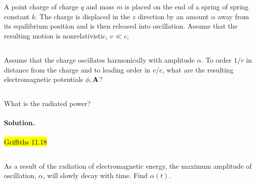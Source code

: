 \documentclass[11pt]{article}
\newenvironment{statement}[1]
{
	\section{#1}
	\color{darkgray}
	\ignorespaces
}
{
}
\newenvironment{problem}
{
	\subsection{}
	\color{darkgray}
    \ignorespaces
}
{

}
\newenvironment{solution}
{
    \paragraph{Solution.}
    \ignorespaces
}
{
    \bigskip
}
\begin{document}
\newcommand{\alp}{\alpha}
\newcommand{\del}{\delta}
\newcommand{\Omg}{\Omega}

\newcommand{\nq}{{n_1}}
\newcommand{\nw}{{n_2}}
\renewcommand{\ne}{{n_3}}

\newcommand{\vA}{\vb{A}}
\newcommand{\vp}{\vb{p}}
\newcommand{\vx}{\vb{x}}
\newcommand{\Qij}{Q_{ij}}
\newcommand{\Qqq}{Q_{11}}

\newcommand{\dcx}{\dd[3]{x}}

\newcommand{\ret}{\text{ret}}

\renewcommand{\qq}{q_1}
\newcommand{\qw}{q_2}
\newcommand{\qe}{q_3}
\newcommand{\qr}{q_4}

\newcommand{\vxq}{\vx_1}
\newcommand{\vxw}{\vx_2}
\newcommand{\vxe}{\vx_3}
\newcommand{\vxr}{\vx_4}

\newcommand{\rhoq}{\rho_1}
\newcommand{\rhow}{\rho_2}
\newcommand{\rhoe}{\rho_3}
\newcommand{\rhor}{\rho_4}

\newcommand{\xh}{\vb{\hat{x}}}
\newcommand{\yh}{\vb{\hat{y}}}





\begin{statement}{}
	A point charge of charge $q$ and mass $m$ is placed on the end of a spring of spring constant $k$.  The charge is displaced in the $z$ direction by an amount $\alp$ away from its equilibrium position and is then released into oscillation.  Assume that the resulting motion is nonrelativistic, $v \ll c$,
\end{statement}

\begin{problem}
	Assume that the charge oscillates harmonically with amplitude $\alp$.  To order $1 / r$ in distance from the charge and to leading order in $v / c$, what are the resulting electromagnetic potentials $\phi, \vA$?
\end{problem}

\begin{problem}
	What is the radiated power?
\end{problem}

\begin{solution}
	\hl{Griffiths 11.18}
\end{solution}

\begin{problem}
	As a result of the radiation of electromagnetic energy, the maximum amplitude of oscillation, $\alp$, will slowly decay with time.  Find $\alp(t)$.
\end{problem}
\end{document}
